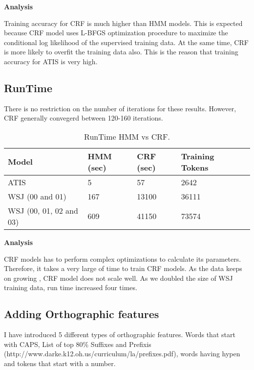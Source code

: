 {\bfseries Analysis}

Training accuracy for CRF is much higher than HMM models. This is expected because CRF model uses L-BFGS optimization procedure to maximize the conditional log likelihood of the supervised training data. At the same time, CRF is more likely to overfit the training data also. This is the reason that training accuracy for ATIS is very high.

\subsection {RunTime}

There is no restriction on the number of iterations for these results. However, CRF generally convegerd between 120-160 iterations.

\begin{center}	
	\begin{table}[ht]
  	\centering
   	\begin{tabular}{| l | l | l | l | l |}
    	\hline
        Model & HMM (sec) & CRF (sec) & Training Tokens \\ \hline
        ATIS & 5 & 57 & 2642\\ \hline
        WSJ (00 and 01) & 167 & 13100 & 36111 \\ \hline
	WSJ (00, 01, 02 and 03) & 609 & 41150 & 73574 \\ \hline
    	\end{tabular}
    	\caption{RunTime HMM vs CRF. }
    	\end{table}%
\end{center}
{\bfseries Analysis}

CRF models has to perform complex optimizations to calculate its parameters. Therefore, it takes a very large of time to train CRF models. As the data keeps on growing , CRF model does not scale well. As we doubled the size of WSJ training data, run time increased four times.

\subsection {Adding Orthographic features}

I have introduced 5 different types of orthographic features. Words that start with CAPS, List of top 80\% Suffixes and Prefixis (http://www.darke.k12.oh.us/curriculum/la/prefixes.pdf), words having hypen and tokens that start with a number.  

